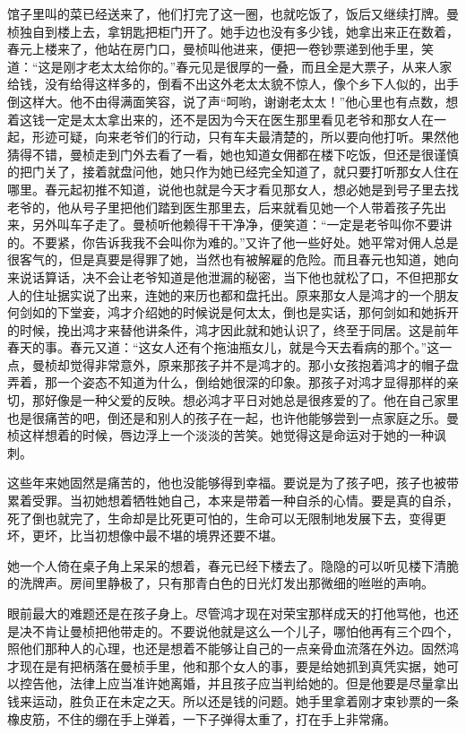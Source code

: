 \par 馆子里叫的菜已经送来了，他们打完了这一圈，也就吃饭了，饭后又继续打牌。曼桢独自到楼上去，拿钥匙把柜门开了。她手边也没有多少钱，她拿出来正在数着，春元上楼来了，他站在房门口，曼桢叫他进来，便把一卷钞票递到他手里，笑道：“这是刚才老太太给你的。”春元见是很厚的一叠，而且全是大票子，从来人家给钱，没有给得这样多的，倒看不出这外老太太貌不惊人，像个乡下人似的，出手倒这样大。他不由得满面笑容，说了声“呵哟，谢谢老太太！”他心里也有点数，想着这钱一定是太太拿出来的，还不是因为今天在医生那里看见老爷和那女人在一起，形迹可疑，向来老爷们的行动，只有车夫最清楚的，所以要向他打听。果然他猜得不错，曼桢走到门外去看了一看，她也知道女佣都在楼下吃饭，但还是很谨慎的把门关了，接着就盘问他，她只作为她已经完全知道了，就只要打听那女人住在哪里。春元起初推不知道，说他也就是今天才看见那女人，想必她是到号子里去找老爷的，他从号子里把他们踏到医生那里去，后来就看见她一个人带着孩子先出来，另外叫车子走了。曼桢听他赖得干干净净，便笑道：“一定是老爷叫你不要讲的。不要紧，你告诉我我不会叫你为难的。”又许了他一些好处。她平常对佣人总是很客气的，但是真要是得罪了她，当然也有被解雇的危险。而且春元也知道，她向来说话算话，决不会让老爷知道是他泄漏的秘密，当下他也就松了口，不但把那女人的住址据实说了出来，连她的来历也都和盘托出。原来那女人是鸿才的一个朋友何剑如的下堂妾，鸿才介绍她的时候说是何太太，倒也是实话，那何剑如和她拆开的时候，挽出鸿才来替他讲条件，鸿才因此就和她认识了，终至于同居。这是前年春天的事。春元又道：“这女人还有个拖油瓶女儿，就是今天去看病的那个。”这一点，曼桢却觉得非常意外，原来那孩子并不是鸿才的。那小女孩抱着鸿才的帽子盘弄着，那一个姿态不知道为什么，倒给她很深的印象。那孩子对鸿才显得那样的亲切，那好像是一种父爱的反映。想必鸿才平日对她总是很疼爱的了。他在自己家里也是很痛苦的吧，倒还是和别人的孩子在一起，也许他能够尝到一点家庭之乐。曼桢这样想着的时候，唇边浮上一个淡淡的苦笑。她觉得这是命运对于她的一种讽刺。
\par 这些年来她固然是痛苦的，他也没能够得到幸福。要说是为了孩子吧，孩子也被带累着受罪。当初她想着牺牲她自己，本来是带着一种自杀的心情。要是真的自杀，死了倒也就完了，生命却是比死更可怕的，生命可以无限制地发展下去，变得更坏，更坏，比当初想像中最不堪的境界还要不堪。
\par 她一个人倚在桌子角上呆呆的想着，春元已经下楼去了。隐隐的可以听见楼下清脆的洗牌声。房间里静极了，只有那青白色的日光灯发出那微细的咝咝的声响。
\par 眼前最大的难题还是在孩子身上。尽管鸿才现在对荣宝那样成天的打他骂他，也还是决不肯让曼桢把他带走的。不要说他就是这么一个儿子，哪怕他再有三个四个，照他们那种人的心理，也还是想着不能够让自己的一点亲骨血流落在外边。固然鸿才现在是有把柄落在曼桢手里，他和那个女人的事，要是给她抓到真凭实据，她可以控告他，法律上应当准许她离婚，并且孩子应当判给她的。但是他要是尽量拿出钱来运动，胜负正在未定之天。所以还是钱的问题。她手里拿着刚才束钞票的一条橡皮筋，不住的绷在手上弹着，一下子弹得太重了，打在手上非常痛。
